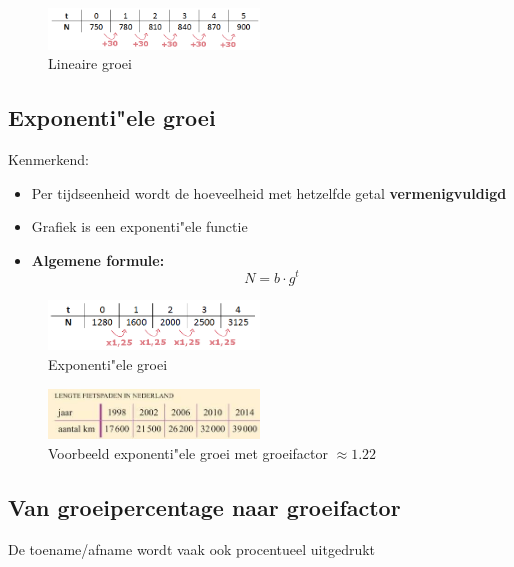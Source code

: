 \documentclass{article}
\begin{document}
\begin{figure}[H]
    \centering
    \includegraphics[width=0.5\textwidth]{lineaire-groei.png}
    \caption{Lineaire groei}
\end{figure}

\subsection{Exponenti"ele groei}

Kenmerkend: 

\begin{itemize}
    \item Per tijdseenheid wordt de hoeveelheid met hetzelfde getal \textbf{vermenigvuldigd}
    \item Grafiek is een exponenti"ele functie
    \item \textbf{Algemene formule:} 
    \begin{equation}
        N = b \cdot g^t
    \end{equation}
\end{itemize}

\begin{figure}[H]
    \centering
    \includegraphics[width=0.5\textwidth]{exponentiele-groei.png}
    \caption{Exponenti"ele groei}
\end{figure}

\begin{figure}[H]
    \centering
    \includegraphics[width=0.5\textwidth]{voorbeeld-groei.png}
    \caption{Voorbeeld exponenti"ele groei met groeifactor $\approx 1.22$}
\end{figure}


\subsection{Van groeipercentage naar groeifactor}

De toename/afname wordt vaak ook procentueel uitgedrukt
\end{document}
